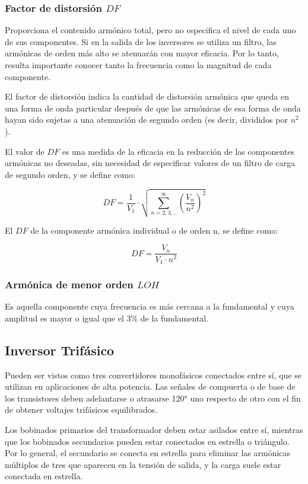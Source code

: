 \documentclass[11pt, a4paper]{article}
\begin{document}
\subsubsection{Factor de distorsión $DF$}
Proporciona el contenido armónico total, pero no especifica el nivel de cada uno de sus componentes. Si en la salida de los inversores se utiliza un filtro, las armónicas de orden más alto se atenuarán con mayor eficacia. Por lo tanto, resulta importante conocer tanto la frecuencia como la magnitud de cada componente. 

El factor de distorsión indica la cantidad de distorsión armónica que queda en una forma de onda particular después de que las armónicas de esa forma de onda hayan sido sujetas a una atenuación de segundo orden (es decir, divididos por $n^2$).

El valor de $DF$ es una medida de la eficacia en la reducción de las componentes armónicas no deseadas, sin necesidad de especificar valores de un filtro de carga de segundo orden, y se define como:

\[ DF = \frac{1}{V_1} \cdot \sqrt{\sum_{n=2,3,..}^{\infty} (\frac{V_n}{n^{2}})^{2}} \]

El $DF$ de la componente armónica individual o de orden n, se define como:

\[ DF = \frac{V_n}{V_1 \cdot n^2} \]

\subsubsection{Armónica de menor orden $LOH$}
Es aquella componente cuya frecuencia es más cercana a la fundamental y cuya amplitud es mayor o igual que el 3\% de la fundamental.

\subsection{Inversor Trifásico}
Pueden ser vistos como tres convertidores monofásicos conectados entre sí, que se utilizan en aplicaciones de alta potencia. Las señales de compuerta o de base de los transistores deben adelantarse o atrasarse 120° uno respecto de otro con el fin de obtener voltajes trifásicos equilibrados. 

Los bobinados primarios del transformador deben estar asilados entre sí, mientras que los bobinados secundarios pueden estar conectados en estrella o triángulo. Por lo general, el secundario se conecta en estrella para eliminar las armónicas múltiplos de tres que aparecen en la tensión de salida, y la carga suele estar conectada en estrella.
\end{document}
